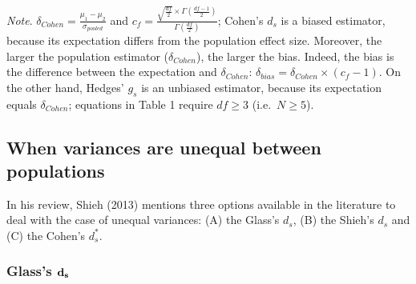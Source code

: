 \documentclass[
  english,
  man,floatsintext]{apa6}
\begin{document}
\begin{landscape}
\emph{Note}. \(\delta_{Cohen}= \frac{\mu_1-\mu_2}{\sigma_{pooled}}\) and \(c_f=\frac{\sqrt{\frac{df}{2}} \times \Gamma\left( \frac{df-1}{2}\right)}{\Gamma\left( \frac{df}{2}\right)}\); Cohen's \(d_s\) is a biased estimator, because its expectation differs from the population effect size. Moreover, the larger the population estimator (\(\delta_{Cohen}\)), the larger the bias. Indeed, the bias is the difference between the expectation and \(\delta_{Cohen}\): \(\delta_{bias} = \delta_{Cohen} \times (c_f-1)\). On the other hand, Hedges' \(g_s\) is an unbiased estimator, because its expectation equals \(\delta_{Cohen}\); equations in Table 1 require \(df \ge 3\) (i.e.~\(N \ge 5\)).

\end{landscape}

\hypertarget{when-variances-are-unequal-between-populations}{%
\subsection{When variances are unequal between populations}\label{when-variances-are-unequal-between-populations}}

In his review, Shieh (2013) mentions three options available in the literature to deal with the case of unequal variances: (A) the Glass's \(d_s\), (B) the Shieh's \(d_s\) and (C) the Cohen's \(d^*_s\).

\hypertarget{glasss-bf-d_s}{%
\subsubsection{\texorpdfstring{Glass's \(\bf d_s\)}{Glass's \textbackslash bf d\_s}}\label{glasss-bf-d_s}}
\end{document}
